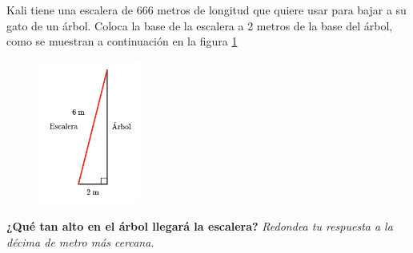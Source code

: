 Kali tiene una escalera de 666 metros de longitud que quiere usar para bajar a su gato de un árbol.
Coloca la base de la escalera a 2 metros de la base del árbol,
como se muestran a continuación en la figura \ref{fig:proverb_pitagoras_06}
\begin{figure}[H]
    \begin{center}
        \includegraphics[width=0.3\textwidth]{../images/proverb_pitagoras_06.png}
    \end{center}
    \caption{}
    \label{fig:proverb_pitagoras_06}
\end{figure}
\textbf{¿Qué tan alto en el árbol llegará la escalera?}
\textit{Redondea tu respuesta a la décima de metro más cercana.}